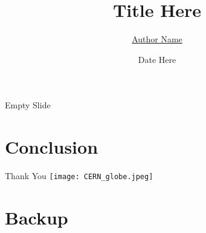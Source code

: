 \documentclass[aspectratio=169]{beamer}
\title[Title Here]
{Title Here}
\author[Author Name]{\underline{Author Name\inst{\dag}}}
\institute[NIU] {\inst{\dag}Northern Illinois University, USA}
\date{Date Here}
\begin{document}
\frame{\titlepage}



\begin{frame}[t]{Empty Slide}

\end{frame}

\section{Conclusion}

\begin{frame}{Thank You}
\centering
\texttt{[image: CERN\_globe.jpeg]} %
\end{frame}

\appendix

\section{Backup }
\end{document}
